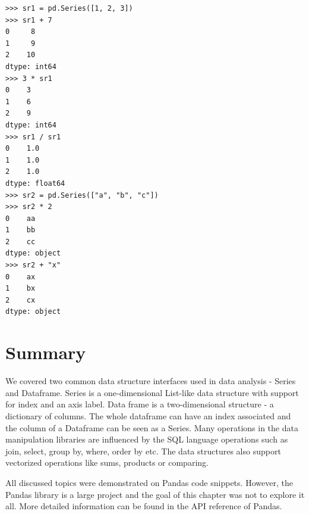 \begin{lstlisting}[caption=Vectorized operations, label={lst:vectorized_operations}, captionpos=b]
>>> sr1 = pd.Series([1, 2, 3])
>>> sr1 + 7
0     8
1     9
2    10
dtype: int64
>>> 3 * sr1
0    3
1    6
2    9
dtype: int64
>>> sr1 / sr1
0    1.0
1    1.0
2    1.0
dtype: float64
>>> sr2 = pd.Series(["a", "b", "c"])
>>> sr2 * 2
0    aa
1    bb
2    cc
dtype: object
>>> sr2 + "x"
0    ax
1    bx
2    cx
dtype: object
\end{lstlisting}

\section*{Summary} %

We covered two common data structure interfaces used in data analysis - Series and Dataframe.
Series is a one-dimensional List-like data structure with support for index and an axis label.
Data frame is a two-dimensional structure - a dictionary of columns.
The whole dataframe can have an index associated and the column of a Dataframe can be seen as a Series.
Many operations in the data manipulation libraries are influenced by the SQL language operations such as join, select,
group by, where, order by etc.
The data structures also support vectorized operations like sums, products or comparing.

All discussed topics were demonstrated on Pandas code snippets.
However, the Pandas library is a large project and the goal of this chapter was not to explore it all.
More detailed information can be found in the API reference of Pandas\cite{pandas_docs}.
